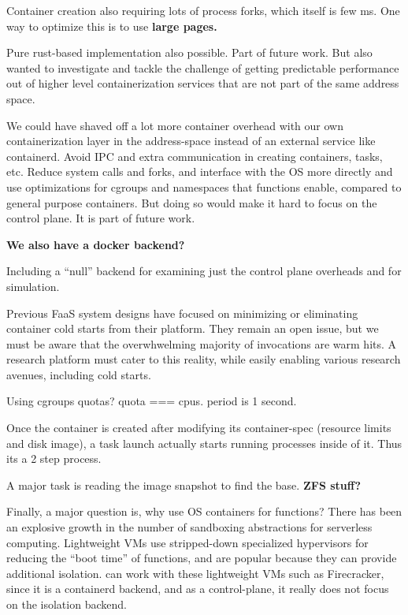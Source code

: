 Container creation also requiring lots of process forks, which itself is few ms. One way to optimize this is to use \textbf{large pages.}


Pure rust-based implementation also possible. Part of future work. But also wanted to investigate and tackle the challenge of getting predictable performance out of higher level containerization services that are not part of the same address space.

We could have shaved off a lot more container overhead with our own containerization layer in the address-space instead of an external service like containerd. Avoid IPC and  extra communication in creating containers, tasks, etc. Reduce system calls and forks, and interface with the OS more directly and use optimizations for cgroups and namespaces that functions enable, compared to general purpose containers.
But doing so would make it hard to focus on the control plane. It is part of future work. 

\textbf{We also have a docker backend?}

Including a ``null'' backend for examining just the control plane overheads and for simulation.

Previous FaaS system designs have focused on minimizing or eliminating container cold starts from their platform.
They remain an open issue, but we must be aware that the overwhwelming majority of invocations are warm hits.
A research platform must cater to this reality, while easily enabling various research avenues, including cold starts.

Using cgroups quotas? quota === cpus. period is 1 second. %



Once the container is created after modifying its container-spec (resource limits and disk image), a task launch actually starts running processes inside of it. Thus its a 2 step process. 

A major task is reading the image snapshot to find the base. \textbf{ZFS stuff?}


Finally, a major question is, why use OS containers for functions?
There has been an explosive growth in the number of sandboxing abstractions for serverless computing.
Lightweight VMs use stripped-down specialized hypervisors for reducing the ``boot time'' of functions, and are popular because they can provide additional isolation.
\sysname can work with these lightweight VMs such as Firecracker, since it is a containerd backend, and as a control-plane, it really does not focus on the isolation backend.


